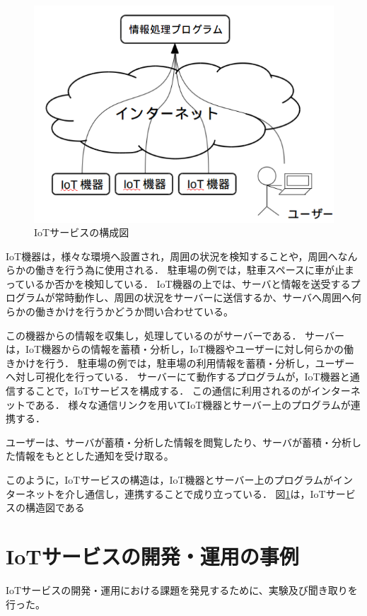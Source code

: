 \begin{figure}[htbp]
\includegraphics[width=14cm]{images/IoTservice.png}
\caption{IoTサービスの構成図}
\label{fig:IoTservice}
\end{figure}

IoT機器は，様々な環境へ設置され，周囲の状況を検知することや，周囲へなんらかの働きを行う為に使用される．
駐車場の例では，駐車スペースに車が止まっているか否かを検知している．
IoT機器の上では、サーバと情報を送受するプログラムが常時動作し、周囲の状況をサーバーに送信するか、サーバへ周囲へ何らかの働きかけを行うかどうか問い合わせている。
\medskip

この機器からの情報を収集し，処理しているのがサーバーである．
サーバーは，IoT機器からの情報を蓄積・分析し，IoT機器やユーザーに対し何らかの働きかけを行う．
駐車場の例では，駐車場の利用情報を蓄積・分析し，ユーザーへ対し可視化を行っている．
サーバーにて動作するプログラムが，IoT機器と通信することで，IoTサービスを構成する．
この通信に利用されるのがインターネットである．
様々な通信リンクを用いてIoT機器とサーバー上のプログラムが連携する．
\medskip


ユーザーは、サーバが蓄積・分析した情報を閲覧したり、サーバが蓄積・分析した情報をもととした通知を受け取る。

このように，IoTサービスの構造は，IoT機器とサーバー上のプログラムがインターネットを介し通信し，連携することで成り立っている．
図\ref{fig:IoTservice}は，IoTサービスの構造図である


\section{IoTサービスの開発・運用の事例}
IoTサービスの開発・運用における課題を発見するために、実験及び聞き取りを行った。

